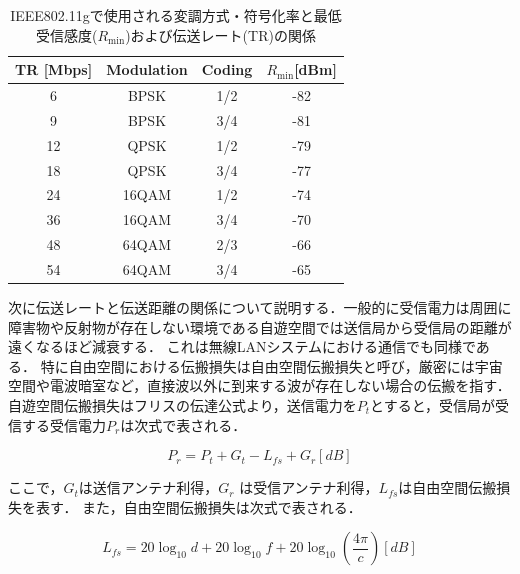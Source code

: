 \documentclass[a4paper,10.5pt]{ltjsarticle}
\begin{document}
\begingroup
\setmainfont{Times New Roman} %
\begin{table}[h]
  \caption{IEEE802.11gで使用される変調方式・符号化率と最低受信感度($R_{\text{min}}$)および伝送レート(TR)の関係}%
  \centering
  \renewcommand{\arraystretch}{1.5}
  \begin{tabular}{c c c c}
    \toprule
    TR [Mbps] & Modulation & Coding & $R_{\text{min}}$[dBm] \\ 
    \midrule
    6  & BPSK  & 1/2  & -82 \\
    9  & BPSK  & 3/4  & -81 \\
    12 & QPSK  & 1/2  & -79 \\
    18 & QPSK  & 3/4  & -77 \\
    24 & 16QAM & 1/2  & -74 \\
    36 & 16QAM & 3/4  & -70 \\
    48 & 64QAM & 2/3  & -66 \\
    54 & 64QAM & 3/4  & -65 \\
    \bottomrule
  \end{tabular}
  \label{tab:IEEE802.11g_TR&Modulation} 
\end{table}
\endgroup
次に伝送レートと伝送距離の関係について説明する．一般的に受信電力は周囲に障害物や反射物が存在しない環境である自遊空間では送信局から受信局の距離が遠くなるほど減衰する．
これは無線LANシステムにおける通信でも同様である．
特に自由空間における伝搬損失は自由空間伝搬損失と呼び，厳密には宇宙空間や電波暗室など，直接波以外に到来する波が存在しない場合の伝搬を指す．
自遊空間伝搬損失はフリスの伝達公式より，送信電力を$P_t$とすると，受信局が受信する受信電力$P_r$は次式で表される．

\begin{equation}
  P_r = P_t + G_t - L_{fs} + G_r [dB]
\end{equation}

ここで，$G_t$は送信アンテナ利得，$G_r$ は受信アンテナ利得，$L_{fs}$は自由空間伝搬損失を表す．
また，自由空間伝搬損失は次式で表される．

\begin{equation}
  L_{fs} = 20\log_{10}d + 20\log_{10}f + 20\log_{10}(\frac{4\pi}{c})[dB]
  \label{eq:lfsp}
\end{equation}
\end{document}
